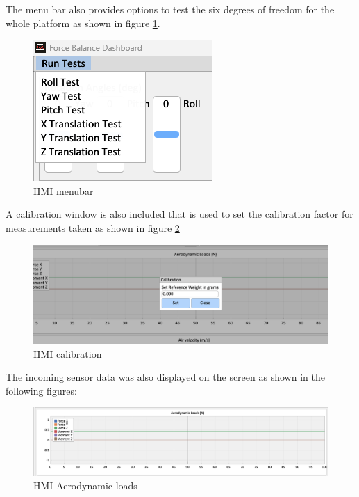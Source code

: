 The menu bar also provides options to test the six degrees of freedom for the whole platform as shown in figure \ref{fig:hmi_menu}.
\begin{center}
	\begin{figure}[H]
		\centering
		\includegraphics{Figures/Screenshot 2022-12-11 195108.png}
		\caption[HMI menubar]{HMI menubar}
		\label{fig:hmi_menu}
	\end{figure}
\end{center}
A calibration window is also included that is used to set the calibration factor for measurements taken as shown in figure \ref{fig:hmi_calib}
\begin{center}
	\begin{figure}[H]
		\centering
		\includegraphics[width=1\linewidth]{Figures/Screenshot 2022-12-11 195034.png}
		\caption[HMI calibration]{HMI calibration}
		\label{fig:hmi_calib}
	\end{figure}
\end{center}
The incoming sensor data was also displayed on the screen as shown in the following figures:
\begin{center}
	\begin{figure}[H]
		\centering
		\includegraphics[width=1\linewidth]{Figures/Screenshot 2022-12-11 194656.png}
		\caption[HMI Aerodynamic loads]{HMI Aerodynamic loads}
	\end{figure}
\end{center}
